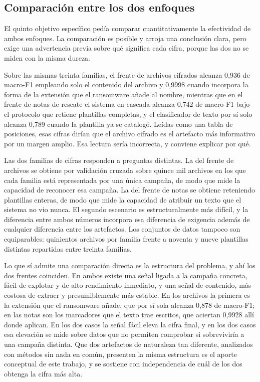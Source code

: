 \subsection{Comparación entre los dos enfoques}
\label{subsec:concl_comparacion}

El quinto objetivo específico pedía comparar cuantitativamente la efectividad de ambos enfoques. La comparación es posible y arroja una conclusión clara, pero exige una advertencia previa sobre qué significa cada cifra, porque las dos no se miden con la misma dureza.

Sobre las mismas treinta familias, el frente de archivos cifrados alcanza 0,936 de macro-F1 empleando solo el contenido del archivo y 0,9998 cuando incorpora la forma de la extensión que el ransomware añade al nombre, mientras que en el frente de notas de rescate el sistema en cascada alcanza 0,742 de macro-F1 bajo el protocolo que retiene plantillas completas, y el clasificador de texto por sí solo alcanza 0,789 cuando la plantilla ya se catalogó. Leídas como una tabla de posiciones, esas cifras dirían que el archivo cifrado es el artefacto más informativo por un margen amplio. Esa lectura sería incorrecta, y conviene explicar por qué.

Las dos familias de cifras responden a preguntas distintas. La del frente de archivos se obtiene por validación cruzada sobre quince mil archivos en los que cada familia está representada por una única campaña, de modo que mide la capacidad de reconocer esa campaña. La del frente de notas se obtiene reteniendo plantillas enteras, de modo que mide la capacidad de atribuir un texto que el sistema no vio nunca. El segundo escenario es estructuralmente más difícil, y la diferencia entre ambos números incorpora esa diferencia de exigencia además de cualquier diferencia entre los artefactos. Los conjuntos de datos tampoco son equiparables: quinientos archivos por familia frente a noventa y nueve plantillas distintas repartidas entre treinta familias.

Lo que sí admite una comparación directa es la estructura del problema, y ahí los dos frentes coinciden. En ambos existe una señal ligada a la campaña concreta, fácil de explotar y de alto rendimiento inmediato, y una señal de contenido, más costosa de extraer y presumiblemente más estable. En los archivos la primera es la extensión que el ransomware añade, que por sí sola alcanza 0,878 de macro-F1; en las notas son los marcadores que el texto trae escritos, que aciertan 0,9928 allí donde aplican. En los dos casos la señal fácil eleva la cifra final, y en los dos casos esa elevación se mide sobre datos que no permiten comprobar si sobreviviría a una campaña distinta. Que dos artefactos de naturaleza tan diferente, analizados con métodos sin nada en común, presenten la misma estructura es el aporte conceptual de este trabajo, y se sostiene con independencia de cuál de los dos obtenga la cifra más alta.

